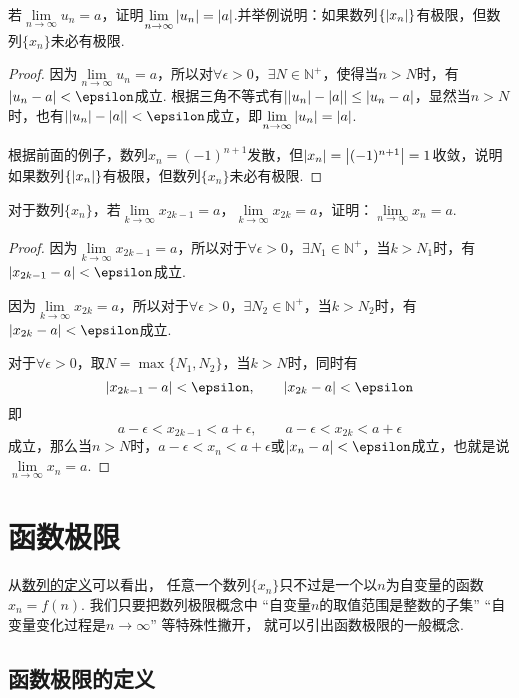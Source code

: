 \begin{example}
\def\l{\lim\limits_{n\to\infty}}
若\(\l u_n = a\)，证明\(\l \abs{u_n} = \abs{a}\).并举例说明：如果数列\(\{\abs{x_n}\}\)有极限，但数列\(\{x_n\}\)未必有极限.
\begin{proof}
因为\(\l u_n = a\)，所以对\(\forall\epsilon>0\)，\(\exists N \in \mathbb{N}^+\)，使得当\(n>N\)时，有\(\abs{u_n-a}<\epsilon\)成立.
根据三角不等式有\(\abs{\abs{u_n}-\abs{a}} \leq \abs{u_n-a}\)，显然当\(n>N\)时，也有\(\abs{\abs{u_n}-\abs{a}}<\epsilon\)成立，即\(\l \abs{u_n} = \abs{a}\).

根据前面的例子，数列\(x_n = (-1)^{n+1}\)发散，但\(\abs{x_n} = \abs{(-1)^{n+1}} = 1\)收敛，说明如果数列\(\{\abs{x_n}\}\)有极限，但数列\(\{x_n\}\)未必有极限.
\end{proof}
\end{example}

\begin{example}
\def\l#1{\lim\limits_{#1\to\infty}}
对于数列\(\{x_n\}\)，若\(\l{k}x_{2k-1}=a\)，\(\l{k}x_{2k}=a\)，证明：\(\l{n}x_n=a\).
\begin{proof}
因为\(\l{k}x_{2k-1}=a\)，所以对于\(\forall\epsilon>0\)，\(\exists N_1 \in \mathbb{N}^+\)，当\(k>N_1\)时，有\(\abs{x_{2k-1}-a}<\epsilon\)成立.

因为\(\l{k}x_{2k}=a\)，所以对于\(\forall\epsilon>0\)，\(\exists N_2 \in \mathbb{N}^+\)，当\(k>N_2\)时，有\(\abs{x_{2k}-a}<\epsilon\)成立.

对于\(\forall\epsilon>0\)，取\(N = \max\{N_1,N_2\}\)，当\(k>N\)时，同时有\[
\abs{x_{2k-1}-a}<\epsilon, \qquad \abs{x_{2k}-a}<\epsilon
\]即\[
a-\epsilon<x_{2k-1}<a+\epsilon, \qquad a-\epsilon<x_{2k}<a+\epsilon
\]成立，那么当\(n>N\)时，\(a-\epsilon<x_n<a+\epsilon\)或\(\abs{x_n-a}<\epsilon\)成立，也就是说\(\l{n}x_n=a\).
\end{proof}
\end{example}

\section{函数极限}
从\hyperref[definition.数列.数列的定义]{数列的定义}可以看出，
任意一个数列\(\{x_n\}\)只不过是一个以\(n\)为自变量的函数\(x_n = f(n)\).
我们只要把数列极限概念中
“自变量\(n\)的取值范围是整数的子集”
“自变量变化过程是\(n\to\infty\)”
等特殊性撇开，
就可以引出函数极限的一般概念.

\subsection{函数极限的定义}
